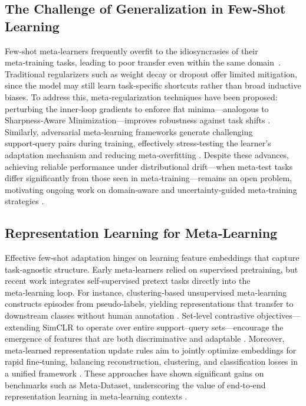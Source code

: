 \subsection{The Challenge of Generalization in Few‑Shot Learning}

\sloppy
Few‑shot meta‑learners frequently overfit to the idiosyncrasies of their meta‑training tasks, leading to poor transfer even within the same domain~\cite{finn2017maml, zhang2017mixup}. Traditional regularizers such as weight decay or dropout offer limited mitigation, since the model may still learn task‑specific shortcuts rather than broad inductive biases. To address this, meta‑regularization techniques have been proposed: perturbing the inner‑loop gradients to enforce flat minima—analogous to Sharpness‑Aware Minimization—improves robustness against task shifts \cite{abbas2022sharp}. Similarly, adversarial meta‑learning frameworks generate challenging support‑query pairs during training, effectively stress‑testing the learner’s adaptation mechanism and reducing meta‑overfitting \cite{gogoi2024perturbing}. Despite these advances, achieving reliable performance under distributional drift—when meta‑test tasks differ significantly from those seen in meta‑training—remains an open problem, motivating ongoing work on domain‑aware and uncertainty‑guided meta‑training strategies \cite{ermis2021towards, lee2023self}.

\subsection{Representation Learning for Meta‑Learning}

\sloppy
Effective few‑shot adaptation hinges on learning feature embeddings that capture task‑agnostic structure. Early meta‑learners relied on supervised pretraining, but recent work integrates self‑supervised pretext tasks directly into the meta‑learning loop. For instance, clustering‑based unsupervised meta‑learning constructs episodes from pseudo‑labels, yielding representations that transfer to downstream classes without human annotation \cite{hsu2018unsupervised}. Set‑level contrastive objectives—extending SimCLR to operate over entire support–query sets—encourage the emergence of features that are both discriminative and adaptable \cite{chen2020simclr}. Moreover, meta‑learned representation update rules aim to jointly optimize embeddings for rapid fine‑tuning, balancing reconstruction, clustering, and classification losses in a unified framework \cite{metz2018metaupdate}. These approaches have shown significant gains on benchmarks such as Meta‑Dataset, underscoring the value of end‑to‑end representation learning in meta‑learning contexts \cite{triantafillou2019meta, gupta2018unsupervised}.

